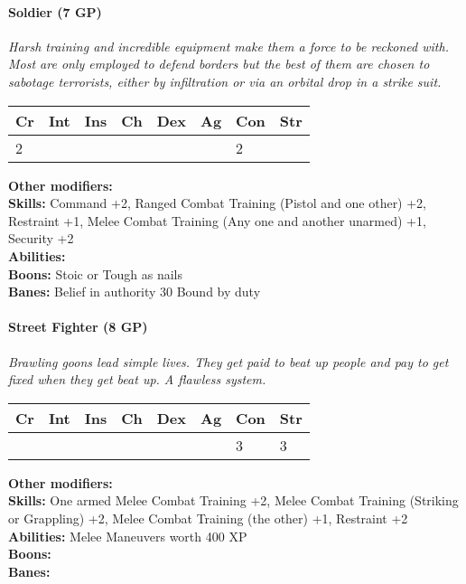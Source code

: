 \paragraph*{Soldier (7 GP)}
\textit{Harsh training and incredible equipment make them a force to be reckoned with. Most are only employed to defend borders but the best of them are chosen to sabotage terrorists, either by infiltration or via an orbital drop in a strike suit.}\par
\begin{tabular}{|l|l|l|l|l|l|l|l|}
	\hline
	Cr & Int & Ins & Ch & Dex & Ag & Con & Str \\ \hline
	2 &  &  &  &  &  & 2 &  \\ \hline
\end{tabular}\par
\noindent\textbf{Other modifiers:} \\
\textbf{Skills:} Command +2,
Ranged Combat Training (Pistol and one other) +2,
Restraint +1,
Melee Combat Training (Any one and another unarmed) +1,
Security +2\\
\textbf{Abilities:} \\
\textbf{Boons:} Stoic or Tough as nails\\
\textbf{Banes:} Belief in authority 30
Bound by duty\\

\hrulefill
\paragraph*{Street Fighter (8 GP)}
\textit{Brawling goons lead simple lives. They get paid to beat up people and pay to get fixed when they get beat up. A flawless system.}\par
\begin{tabular}{|l|l|l|l|l|l|l|l|}
    \hline
    Cr & Int & Ins & Ch & Dex & Ag & Con & Str \\ \hline
    &  &  &  &  &  & 3 & 3 \\ \hline
\end{tabular}\par
\noindent\textbf{Other modifiers:} \\
\textbf{Skills:} One armed Melee Combat Training +2,
Melee Combat Training (Striking or Grappling) +2,
Melee Combat Training (the other) +1,
Restraint +2\\
\textbf{Abilities:} Melee Maneuvers worth 400 XP\\
\textbf{Boons:} \\
\textbf{Banes:} \\

